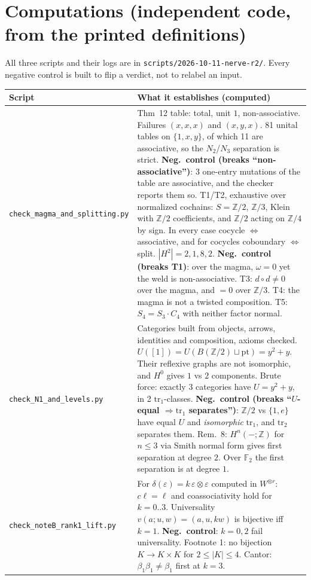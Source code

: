 \documentclass[11pt]{article}
\newcommand{\Z}{\mathbb{Z}}
\newcommand{\F}{\mathbb{F}}
\begin{document}
\section{Computations (independent code, from the printed definitions)}
All three scripts and their logs are in \texttt{scripts/2026-10-11-nerve-r2/}. Every negative
control is built to flip a verdict, not to relabel an input.
\begin{longtable}{p{4.4cm}p{10.6cm}}
\toprule
Script & What it establishes (\textbf{computed})\\\midrule\endhead
\texttt{check\_magma\_and\_}\newline\texttt{splitting.py} &
Thm~12 table: total, unit $1$, non-associative. Failures $(x,x,x)$ and $(x,y,x)$. 81 unital tables on
$\{1,x,y\}$, of which 11 are associative, so the $N_2$/$N_3$ separation is strict.
\textbf{Neg.\ control (breaks ``non-associative'')}: 3 one-entry mutations of the table are
associative, and the checker reports them so.
T1/T2, exhaustive over normalized cochains: $S=\Z/2$, $\Z/3$, Klein with $\Z/2$ coefficients, and
$\Z/2$ acting on $\Z/4$ by sign. In every case cocycle $\iff$ associative, and for cocycles
coboundary $\iff$ split. $|H^2|=2,1,8,2$.
\textbf{Neg.\ control (breaks T1)}: over the magma, $\omega=0$ yet the weld is non-associative.
T3: $d\circ d\neq0$ over the magma, and $=0$ over $\Z/3$. T4: the magma is not a twisted
composition. T5: $S_4=S_3\cdot C_4$ with neither factor normal.\\
\texttt{check\_N1\_and\_}\newline\texttt{levels.py} &
Categories built from objects, arrows, identities and composition, axioms checked.
$U([1])=U(B(\Z/2)\sqcup\mathrm{pt})=y^2+y$. Their reflexive graphs are not isomorphic, and $H^0$
gives $1$ vs $2$ components. Brute force: exactly 3 categories have $U=y^2+y$, in 2
$\mathrm{tr}_1$-classes.
\textbf{Neg.\ control (breaks ``$U$-equal $\Rightarrow\mathrm{tr}_1$ separates'')}: $\Z/2$ vs
$\{1,e\}$ have equal $U$ and \emph{isomorphic} $\mathrm{tr}_1$, and $\mathrm{tr}_2$ separates them.
Rem.~8: $H^n(-;\Z)$ for $n\le3$ via Smith normal form gives first separation at degree $2$. Over
$\F_2$ the first separation is at degree $1$.\\
\texttt{check\_noteB\_}\newline\texttt{rank1\_lift.py} &
For $\delta(\varepsilon)=k\,\varepsilon\otimes\varepsilon$ computed in $W^{\otimes r}$: $c\ell=\ell$
and coassociativity hold for $k=0..3$. Universality $v(a;u,w)=(a,u,kw)$ is bijective iff $k=1$.
\textbf{Neg.\ control}: $k=0,2$ fail universality. Footnote 1: no bijection $K\to K\times K$ for
$2\le|K|\le4$. Cantor: $\beta_1\beta_1\neq\beta_1$ first at $k=3$.\\
\bottomrule
\end{longtable}
\end{document}
